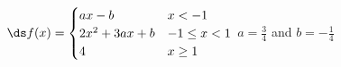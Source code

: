 {$\ds f(x)=\begin{cases}
ax-b & x<-1 \\
2x^2+3ax+b &-1\leq x<1 \\
4 & x\geq 1
\end{cases}$}
{$a=\frac34$ and $b=-\frac14$}
